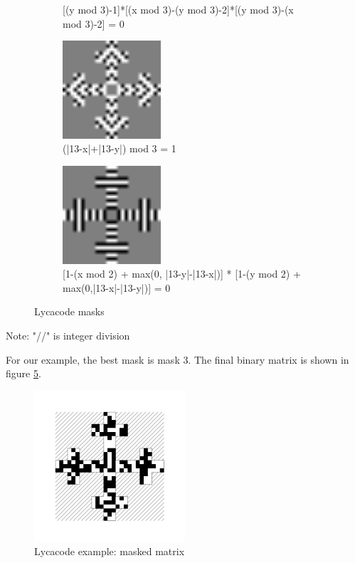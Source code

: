 \begin{figure}[H]
\begin{subfigure}{0.4\textwidth}
    \caption{[(y mod 3)-1]*[(x mod 3)-(y mod 3)-2]*[(y mod 3)-(x mod 3)-2] = 0}
    \label{fig:lycacode_mask_5}
  \end{subfigure}
  \begin{subfigure}{0.4\textwidth}
    \centering
    \includegraphics[width=0.4\textwidth]{images/lycacode_mask_6}
    \caption{(|13-x|+|13-y|) mod 3 = 1}
    \label{fig:lycacode_mask_6}
  \end{subfigure}
  \begin{subfigure}{0.4\textwidth}
    \centering
    \includegraphics[width=0.4\textwidth]{images/lycacode_mask_7}
    \caption{[1-(x mod 2) + max(0, |13-y|-|13-x|)] * [1-(y mod 2) + max(0,|13-x|-|13-y|)] = 0}
    \label{fig:lycacode_mask_7}
  \end{subfigure}
  \caption{Lycacode masks}
  \label{fig:lycacode_masks}
\end{figure}

Note: "//" is integer division

For our example, the best mask is mask 3. The final binary matrix is shown in figure \ref{fig:lycacode_ex_final_mat}.

\begin{figure}[H]
  \centering
  \includegraphics[width=0.5\textwidth]{images/lycacode_ex_final_mat}
  \caption{Lycacode example: masked matrix}
  \label{fig:lycacode_ex_final_mat}
\end{figure}


